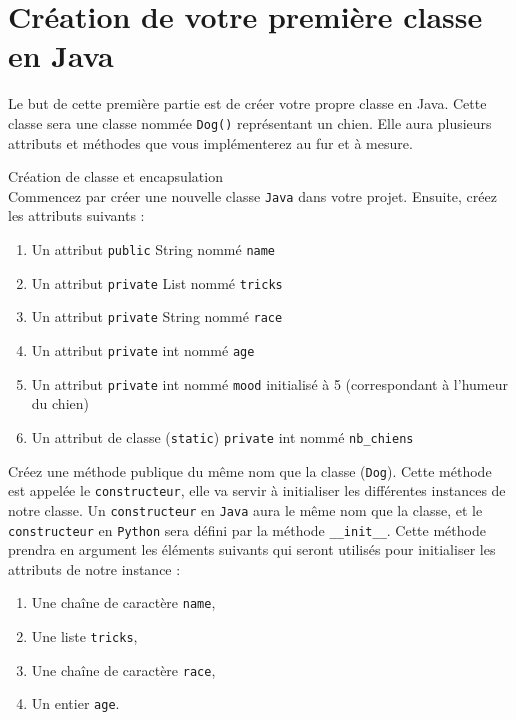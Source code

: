 \section{Création de votre première classe en Java}

Le but de cette première partie est de créer votre propre classe en Java. Cette classe sera une classe nommée \lstinline{Dog()} représentant un chien. Elle aura plusieurs attributs et méthodes que vous implémenterez au fur et à mesure.
\\

\begin{Exercice}[10 minutes] Création de classe et encapsulation\\
    Commencez par créer une nouvelle classe \lstinline{Java} dans votre projet. Ensuite, créez les attributs suivants :
    \begin{enumerate}
    \item Un attribut \lstinline{public} String nommé \lstinline{name}
    \item Un attribut \lstinline{private} List nommé \lstinline{tricks}
    \item Un attribut \lstinline{private} String nommé \lstinline{race}
    \item Un attribut \lstinline{private} int nommé \lstinline{age}
    \item Un attribut \lstinline{private} int nommé \lstinline{mood} initialisé à 5 (correspondant à l'humeur du chien)
    \item Un attribut de classe (\lstinline{static}) \lstinline{private} int nommé \lstinline{nb_chiens}
   	\end{enumerate}
   	
   	Créez une méthode publique du même nom que la classe (\lstinline{Dog}). Cette méthode est appelée le \lstinline{constructeur}, elle va servir à initialiser les différentes instances de notre classe. Un \lstinline{constructeur} en \lstinline{Java} aura le même nom que la classe, et le \lstinline{constructeur} en \lstinline{Python} sera défini par la méthode \lstinline{__init__}. Cette méthode prendra en argument les éléments suivants qui seront utilisés pour initialiser les attributs de notre instance :
   	\begin{enumerate}
    \item Une chaîne de caractère \lstinline{name},
    \item Une liste \lstinline{tricks},
    \item Une chaîne de caractère \lstinline{race},
    \item Un entier \lstinline{age}.
   	\end{enumerate}
   	

\end{Exercice}
